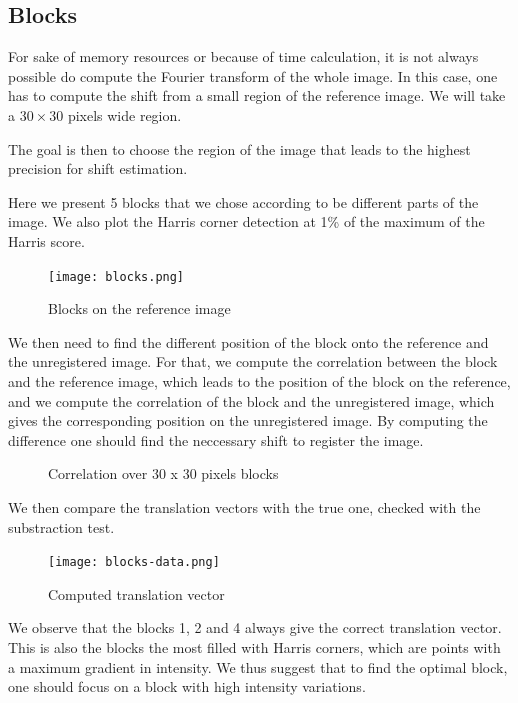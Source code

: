 \pagebreak
\subsection{Blocks}
For sake of memory resources or because of time calculation, it is not always possible do compute the Fourier transform of the whole image. In this case, one has to compute the shift from a small region of the reference image. We will take a $30 \times 30$ pixels wide region.

The goal is then to choose the region of the image that leads to the highest precision for shift estimation.

Here we present 5 blocks that we chose according to be different parts of the image. We also plot the Harris corner detection at 1\% of the maximum of the Harris score.

\begin{figure}[h]
	\centering
	\texttt{[image: blocks.png]}
	\caption{Blocks on the reference image}
	\label{fig:blocks}
\end{figure}

We then need to find the different position of the block onto the reference and the unregistered image. For that, we compute the correlation between the block and the reference image, which leads to the position of the block on the reference, and we compute the correlation of the block and the unregistered image, which gives the corresponding position on the unregistered image. By computing the difference one should find the neccessary shift to register the image. 

\begin{figure}[h]
    \centering
	\caption{Correlation over 30 x 30 pixels blocks}
\end{figure}


We then compare the translation vectors with the true one, checked with the substraction test.
\begin{figure}[h]
	\centering
	\texttt{[image: blocks-data.png]}
	\caption{Computed translation vector}
	\label{fig:blocks-data}
\end{figure}

We observe that the blocks 1, 2 and 4 always give the correct translation vector. This is also the blocks the most filled with Harris corners, which are points with a maximum gradient in intensity. We thus suggest that to find the optimal block, one should focus on a block with high intensity variations.

